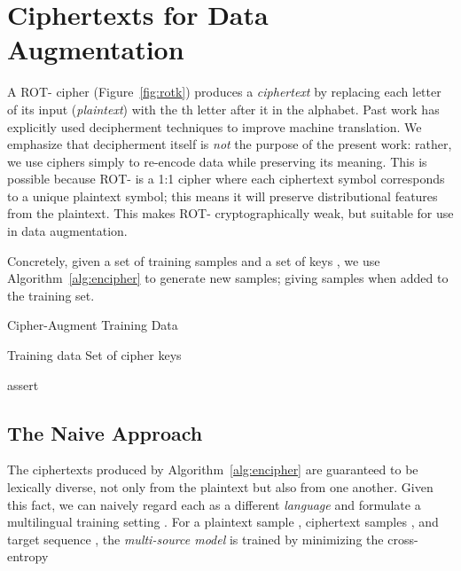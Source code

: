 \documentclass[11pt]{article}
\begin{document}
\section{Ciphertexts for Data Augmentation}
A ROT- cipher (Figure~\ref{fig:rotk}) produces a \textit{ciphertext} by replacing each letter of its input (\textit{plaintext}) with the th letter after it in the alphabet. 
Past work \cite{dou-knight-2012-large,dou-etal-2014-beyond} has explicitly used decipherment techniques \cite{kambhatla-etal-2018-decipherment} to improve machine translation. We emphasize that decipherment itself is \textit{not} the purpose of the present work:
rather, we use ciphers simply to re-encode
data while preserving its meaning. This is possible because ROT- is a 1:1 cipher where each ciphertext symbol corresponds to a unique plaintext symbol; this means it will preserve distributional features from the plaintext.
This makes ROT- cryptographically weak, but suitable for use in data augmentation.


Concretely, given a set of  training samples  and a set of keys , we use Algorithm~\ref{alg:encipher} to generate 
 new samples; giving  samples when added to the training set. 
 

\begin{algorithm}
\small
\caption{Cipher-Augment Training Data}\label{alg:encipher}
\begin{algorithmic}
\State Training data 
\State Set of cipher keys  


    \State {}
    \State  \State {}
    \State assert  \EndFor
\State \Return{  }
\EndProcedure

\end{algorithmic}
\end{algorithm}



\subsection{The Naive Approach}

The ciphertexts produced by Algorithm~\ref{alg:encipher} are guaranteed to be lexically diverse, not only from the plaintext but also from one another.
Given this fact, we can naively regard each  as a different \emph{language} and formulate a multilingual training setting \cite{johnson2017google}. For a plaintext sample , ciphertext samples , and target sequence , the \emph{multi-source model} is trained by minimizing the cross-entropy
\end{document}
